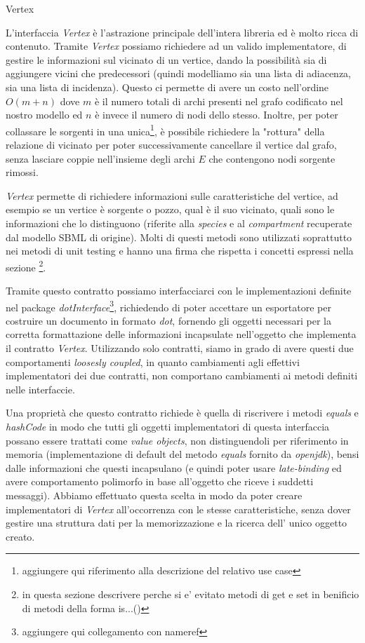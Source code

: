 \begin{paragraph}{Vertex}

  L'interfaccia \emph{Vertex} \`e l'astrazione principale dell'intera
  libreria ed \`e molto ricca di contenuto.  Tramite \emph{Vertex}
  possiamo richiedere ad un valido implementatore, di gestire le
  informazioni sul vicinato di un vertice, dando la possibilit\`a sia
  di aggiungere vicini che predecessori (quindi modelliamo sia una
  lista di adiacenza, sia una lista di incidenza). Questo ci permette
  di avere un costo nell'ordine $O(m + n)$ dove $m$ \`e il numero
  totali di archi presenti nel grafo codificato nel nostro modello ed
  $n$ \`e invece il numero di nodi dello stesso. Inoltre, per poter
  collassare le sorgenti in una unica\footnote{aggiungere qui
    riferimento alla descrizione del relativo use case}, \`e possibile
  richiedere la "rottura" della relazione di vicinato per poter
  successivamente cancellare il vertice dal grafo, senza lasciare
  coppie nell'insieme degli archi $E$ che contengono nodi sorgente
  rimossi.

  \emph{Vertex} permette di richiedere informazioni sulle
  caratteristiche del vertice, ad esempio se un vertice \`e sorgente o
  pozzo, qual \`e il suo vicinato, quali sono le informazioni che lo
  distinguono (riferite alla \emph{species} e al \emph{compartment}
  recuperate dal modello SBML di origine). Molti di questi metodi sono
  utilizzati soprattutto nei metodi di unit testing e hanno una firma
  che rispetta i concetti espressi nella sezione
  \footnote{in
    questa sezione descrivere perche si e' evitato metodi di get e set
    in benificio di metodi della forma is...()}.

  Tramite questo contratto possiamo interfacciarci con le
  implementazioni definite nel package
  \emph{dotInterface}\footnote{aggiungere qui collegamento con
    nameref}, richiedendo di poter accettare un esportatore per
  costruire un documento in formato \emph{dot}, fornendo gli oggetti
  necessari per la corretta formattazione delle informazioni
  incapsulate nell'oggetto che implementa il contratto
  \emph{Vertex}. Utilizzando solo contratti, siamo in grado di avere
  questi due comportamenti \emph{loosesly coupled}, in quanto
  cambiamenti agli effettivi implementatori dei due contratti, non
  comportano cambiamenti ai metodi definiti nelle interfaccie.

  Una propriet\`a che questo contratto richiede \`e quella di
  riscrivere i metodi \emph{equals} e \emph{hashCode} in modo che
  tutti gli oggetti implementatori di questa interfaccia possano
  essere trattati come \emph{value objects}, non distinguendoli per
  riferimento in memoria (implementazione di default del metodo
  \emph{equals} fornito da \emph{openjdk}), bensi dalle informazioni
  che questi incapsulano (e quindi poter usare \emph{late-binding} ed
  avere comportamento polimorfo in base all'oggetto che riceve i
  suddetti messaggi). Abbiamo effettuato questa scelta in modo da
  poter creare implementatori di \emph{Vertex} all'occorrenza con le
  stesse caratteristiche, senza dover gestire una struttura dati per
  la memorizzazione e la ricerca dell' unico oggetto creato.


\end{paragraph}
